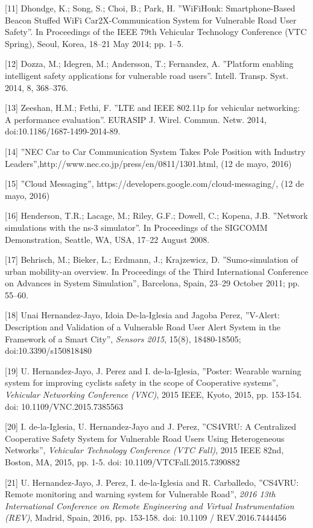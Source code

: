 [11] Dhondge, K.; Song, S.; Choi, B.; Park, H. ''WiFiHonk: Smartphone-Based
Beacon Stuffed WiFi Car2X-Communication System for Vulnerable Road User
Safety''. In Proceedings of the IEEE 79th Vehicular Technology Conference
(VTC Spring), Seoul, Korea, 18–21 May 2014; pp. 1–5.

[12] Dozza, M.; Idegren, M.; Andersson, T.; Fernandez, A. ''Platform enabling
intelligent safety applications for vulnerable road users''. Intell. Transp.
Syst. 2014, 8, 368–376.

[13] Zeeshan, H.M.; Fethi, F. ''LTE and IEEE 802.11p for vehicular networking:
A performance evaluation''. EURASIP J. Wirel. Commun. Netw. 2014,
doi:10.1186/1687-1499-2014-89.

[14] ''NEC Car to Car Communication System Takes Pole Position with Industry
Leaders'',http://www.nec.co.jp/press/en/0811/1301.html, (12 de mayo, 2016)

[15] ''Cloud Messaging'', https://developers.google.com/cloud-messaging/, (12 de
mayo, 2016)

[16] Henderson, T.R.; Lacage, M.; Riley, G.F.; Dowell, C.; Kopena, J.B.
''Network simulations with the ns-3 simulator''. In Proceedings of the SIGCOMM
Demonstration, Seattle, WA, USA, 17–22 August 2008.

[17] Behrisch, M.; Bieker, L.; Erdmann, J.; Krajzewicz, D. ''Sumo-simulation
of urban mobility-an overview. In Proceedings of the Third International
Conference on Advances in System Simulation'', Barcelona, Spain, 23–29 October
2011; pp. 55–60.

[18] Unai Hernandez-Jayo, Idoia De-la-Iglesia and Jagoba Perez, ''V-Alert:
Description and Validation of a Vulnerable Road User Alert System in the
Framework of a Smart City'', \emph{Sensors 2015}, 15(8), 18480-18505;
doi:10.3390/s150818480

[19] U. Hernandez-Jayo, J. Perez and I. de-la-Iglesia, ''Poster: Wearable
warning system for improving cyclists safety in the scope of Cooperative
systems'', \emph{Vehicular Networking Conference (VNC)}, 2015 IEEE, Kyoto,
2015, pp. 153-154. doi: 10.1109/VNC.2015.7385563

[20] I. de-la-Iglesia, U. Hernandez-Jayo and J. Perez, ''CS4VRU: A Centralized
Cooperative Safety System for Vulnerable Road Users Using Heterogeneous
Networks'', \emph{Vehicular Technology Conference (VTC Fall)}, 2015 IEEE 82nd,
Boston, MA, 2015, pp. 1-5. doi: 10.1109/VTCFall.2015.7390882

[21] U. Hernandez-Jayo, J. Perez, I. de-la-Iglesia and R. Carballedo,
''CS4VRU: Remote monitoring and warning system for Vulnerable Road'',
\emph{2016 13th International Conference on Remote Engineering and Virtual
Instrumentation (REV)}, Madrid, Spain, 2016, pp. 153-158. doi: 10.1109 /
REV.2016.7444456

